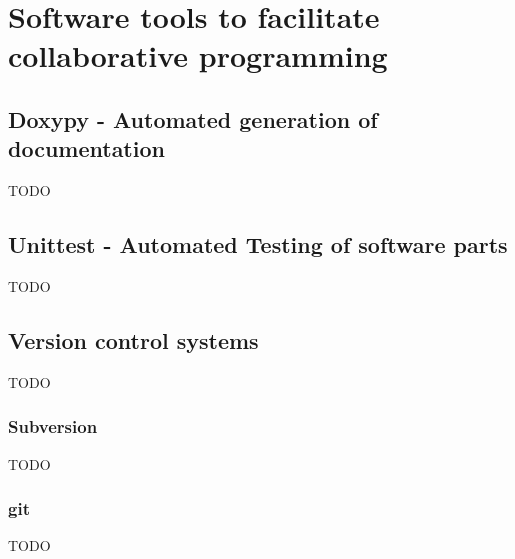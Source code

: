 
\chapter{Software tools to facilitate collaborative programming}

	\section{Doxypy - Automated generation of documentation}
		TODO

	\section{Unittest - Automated Testing of software parts}
		TODO

	\section{Version control systems}
		TODO

		\subsection{Subversion}
			TODO

		\subsection{git}
			TODO

